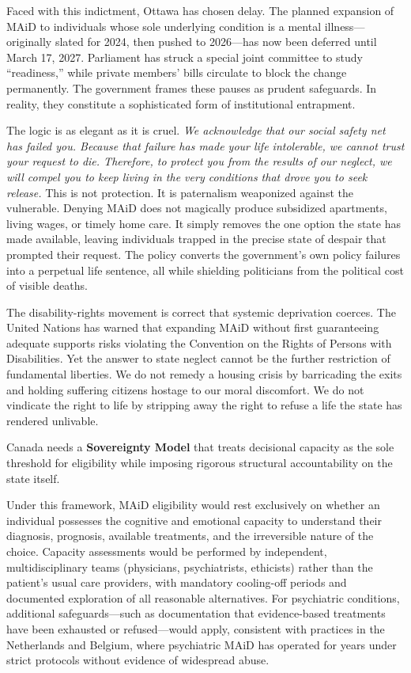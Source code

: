 \documentclass[11pt, letterpaper]{article}
\begin{document}
Faced with this indictment, Ottawa has chosen delay. The planned expansion of MAiD to individuals whose sole underlying condition is a mental illness---originally slated for 2024, then pushed to 2026---has now been deferred until March 17, 2027. Parliament has struck a special joint committee to study ``readiness,'' while private members' bills circulate to block the change permanently. The government frames these pauses as prudent safeguards. In reality, they constitute a sophisticated form of institutional entrapment.

The logic is as elegant as it is cruel. \textit{We acknowledge that our social safety net has failed you. Because that failure has made your life intolerable, we cannot trust your request to die. Therefore, to protect you from the results of our neglect, we will compel you to keep living in the very conditions that drove you to seek release.} This is not protection. It is paternalism weaponized against the vulnerable. Denying MAiD does not magically produce subsidized apartments, living wages, or timely home care. It simply removes the one option the state has made available, leaving individuals trapped in the precise state of despair that prompted their request. The policy converts the government's own policy failures into a perpetual life sentence, all while shielding politicians from the political cost of visible deaths.

The disability-rights movement is correct that systemic deprivation coerces. The United Nations has warned that expanding MAiD without first guaranteeing adequate supports risks violating the Convention on the Rights of Persons with Disabilities. Yet the answer to state neglect cannot be the further restriction of fundamental liberties. We do not remedy a housing crisis by barricading the exits and holding suffering citizens hostage to our moral discomfort. We do not vindicate the right to life by stripping away the right to refuse a life the state has rendered unlivable.

Canada needs a \textbf{Sovereignty Model} that treats decisional capacity as the sole threshold for eligibility while imposing rigorous structural accountability on the state itself.

Under this framework, MAiD eligibility would rest exclusively on whether an individual possesses the cognitive and emotional capacity to understand their diagnosis, prognosis, available treatments, and the irreversible nature of the choice. Capacity assessments would be performed by independent, multidisciplinary teams (physicians, psychiatrists, ethicists) rather than the patient's usual care providers, with mandatory cooling-off periods and documented exploration of all reasonable alternatives. For psychiatric conditions, additional safeguards---such as documentation that evidence-based treatments have been exhausted or refused---would apply, consistent with practices in the Netherlands and Belgium, where psychiatric MAiD has operated for years under strict protocols without evidence of widespread abuse.
\end{document}
